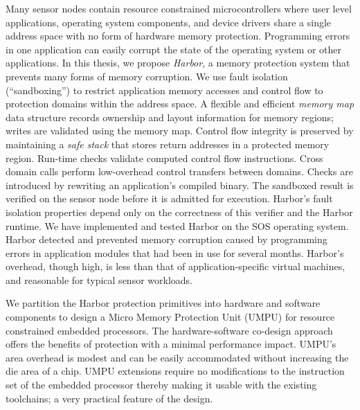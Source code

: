 \noindent
Many sensor nodes contain resource constrained microcontrollers where user
level applications, operating system components, and device drivers share
a single address space with no form of hardware memory protection.
%
Programming errors in one application can easily corrupt the state of
the operating system or other applications.
%
In this thesis, we propose \textit{Harbor}, a memory protection system that
prevents many forms of memory corruption.
%
We use fault isolation (``sandboxing'') to restrict application memory
accesses and control flow to protection domains within the address
space.
%
%
A flexible and efficient \emph{memory map} data structure records
ownership and layout information for memory regions; writes are
validated using the memory map.
%
Control flow integrity is preserved by maintaining a \emph{safe stack}
that stores return addresses in a protected memory region.
%
Run-time checks validate computed control flow instructions.
%
Cross domain calls perform low-overhead control transfers between domains.
%
Checks are introduced by rewriting an application's compiled
binary. 
%
The sandboxed result is verified on the sensor node before it is admitted
for execution. 
%
Harbor's fault isolation properties depend only on the
correctness of this verifier and the Harbor runtime.
%
%
We have implemented and tested Harbor on the SOS operating system.
%
Harbor detected and prevented memory corruption caused by programming
errors  in application modules that had been in use for several
months.
%
Harbor's overhead, though high, is less than that of application-specific
virtual machines, and reasonable for typical sensor workloads.

We partition the Harbor protection primitives into hardware and
software components to design a Micro Memory Protection Unit (UMPU)
for resource constrained embedded processors.
%
The hardware-software co-design approach offers the benefits of protection with a
minimal performance impact.
%
UMPU's area overhead is modest and can be easily accommodated without
increasing the die area of a chip.
%
UMPU extensions require no modifications to the instruction set of the embedded
processor thereby making it usable with the existing toolchains; a very
practical feature of the design.
